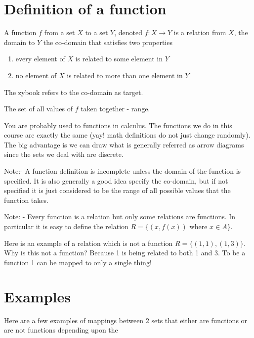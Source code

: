 \documentclass[12pt]{article}
\begin{document}
\section*{Definition of a function}

A function $f$ from a set $X$ to a set $Y$, denoted $f : X \rightarrow Y$ is a relation from $X$, the domain
to $Y$ the co-domain that satisfies two properties

\begin{enumerate}
\item every element of $X$ is related to some element in $Y$
\item no element of $X$ is related to more than one element in $Y$
\end{enumerate}

The zybook refers to the co-domain as target. 

The set of all values of  $f$ taken together - range. 

You are probably used to functions in calculus. The functions we do in this course are exactly the same (yay! math definitions do not just change randomly). The big advantage is we can draw what is generally referred as arrow diagrams since the sets we deal with are discrete.

Note:- A function definition is incomplete unless the domain of the function is specified. It is also generally a good idea specify the co-domain, but if not specified it is just considered to be the range of all possible values that the function takes.

Note: - Every function is a relation but only some relations are functions. In particular it is easy to define the relation $R = \{(x, f(x)) \text{ where }  x \in A \}$. 

Here is an example of a relation which is not a function $R = \{(1,1), (1,3)\}$. Why is this not a function? Because 1 is being related to both 1 and 3. To be a function 1 can be mapped to only a single thing!

\section*{Examples}

Here are a few examples of mappings between 2 sets that either are functions or are not functions depending upon the 
\end{document}
